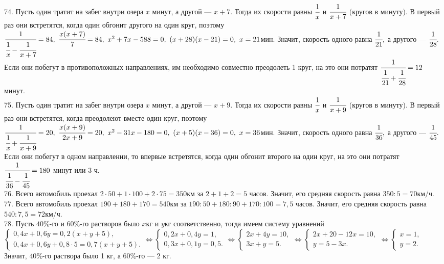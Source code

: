 \documentclass[12pt]{article}
\begin{document}
74. Пусть один тратит на забег внутри озера $x$ минут, а другой --- $x+7.$ Тогда их скорости равны $\cfrac{1}{x}$ и $\cfrac{1}{x+7}$ (кругов в минуту). В первый раз они встретятся, когда один обгонит другого на один круг, поэтому $\cfrac{1}{\cfrac{1}{x}-\cfrac{1}{x+7}}=84,\ \cfrac{x(x+7)}{7}=84,\
x^2+7x-588=0,\ (x+28)(x-21)=0,\ x=21$мин. Значит, скорость одного равна $\cfrac{1}{21},$ а другого --- $\cfrac{1}{28}.$ Если они побегут в противоположных направлениях, им  необходимо совместно преодолеть 1 круг, на это они потратят $\cfrac{1}{\cfrac{1}{21}+\cfrac{1}{28}}=12$ минут.\\
75. Пусть один тратит на забег внутри озера $x$ минут, а другой --- $x+9.$ Тогда их скорости равны $\cfrac{1}{x}$ и $\cfrac{1}{x+9}$ (кругов в минуту). В первый раз они встретятся, когда преодолеют вместе один круг, поэтому $\cfrac{1}{\cfrac{1}{x}+\cfrac{1}{x+9}}=20,\ \cfrac{x(x+9)}{2x+9}=20,\
x^2-31x-180=0,\ (x+5)(x-36)=0,\ x=36$мин. Значит, скорость одного равна $\cfrac{1}{36},$ а другого --- $\cfrac{1}{45}.$ Если они побегут в одном направлении, то впервые встретятся, когда один обгонит второго на один круг, на это они потратят $\cfrac{1}{\cfrac{1}{36}-\cfrac{1}{45}}=180$ минут или 3 ч.\\
76. Всего автомобиль проехал $2\cdot50+1\cdot100+2\cdot75=350$км за $2+1+2=5$ часов. Значит, его средняя скорость равна $350:5=70$км/ч.\\
77. Всего автомобиль проехал $190+180+170=540$км за $190:50+180:90+170:100=7,5$ часов. Значит, его средняя скорость равна $540:7,5=72$км/ч.\\
78. Пусть $40\%$-го и $60\%$-го растворов было $x$кг и $y$кг соответственно, тогда имеем систему уравнений $\begin{cases}
0,4x+0,6y=0,2(x+y+5),\\ 0,4x+0,6y+0,8\cdot5=0,7(x+y+5).\end{cases}\Leftrightarrow\begin{cases}
0,2x+0,4y=1,\\ 0,3x+0,1y=0,5.\end{cases}\Leftrightarrow\begin{cases}
2x+4y=10,\\ 3x+y=5.\end{cases}\Leftrightarrow\begin{cases}
2x+20-12x=10,\\ y=5-3x.\end{cases}\Leftrightarrow\begin{cases}
x=1,\\ y=2.\end{cases}$ Значит, $40\%$-го раствора было 1 кг, а $60\%$-го --- 2 кг.\\
\end{document}
